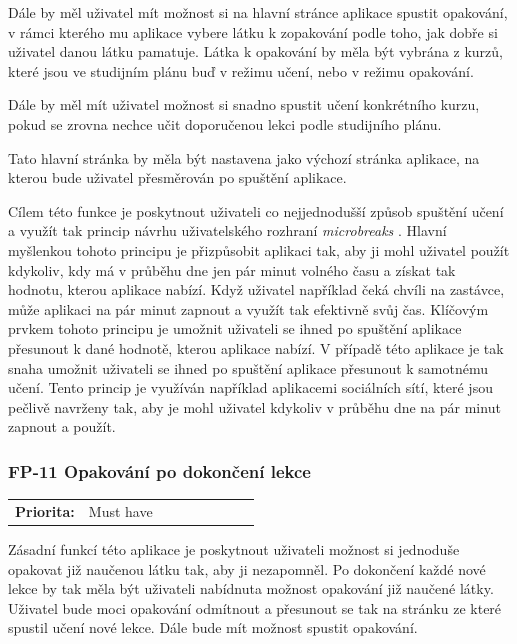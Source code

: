 Dále by měl uživatel mít možnost si na hlavní stránce aplikace spustit opakování, v rámci kterého mu aplikace vybere látku k zopakování podle toho, jak dobře si uživatel danou látku pamatuje. Látka k opakování by měla být vybrána z kurzů, které jsou ve studijním plánu buď v režimu učení, nebo v režimu opakování.

Dále by měl mít uživatel možnost si snadno spustit učení konkrétního kurzu, pokud se zrovna nechce učit doporučenou lekci podle studijního plánu.

Tato hlavní stránka by měla být nastavena jako výchozí stránka aplikace, na kterou bude uživatel přesměrován po spuštění aplikace.

Cílem této funkce je poskytnout uživateli co nejjednodušší způsob spuštění učení a využít tak princip návrhu uživatelského rozhraní \textit{microbreaks} \cite{Tidwell2020DesigningInterfaces}. Hlavní myšlenkou tohoto principu je přizpůsobit aplikaci tak, aby ji mohl uživatel použít kdykoliv, kdy má v průběhu dne jen pár minut volného času a získat tak hodnotu, kterou aplikace nabízí. Když uživatel například čeká chvíli na zastávce, může aplikaci na pár minut zapnout a využít tak efektivně svůj čas. Klíčovým prvkem tohoto principu je umožnit uživateli se ihned po spuštění aplikace přesunout k dané hodnotě, kterou aplikace nabízí. V případě této aplikace je tak snaha umožnit uživateli se ihned po spuštění aplikace přesunout k samotnému učení. Tento princip je využíván například aplikacemi sociálních sítí, které jsou pečlivě navrženy tak, aby je mohl uživatel kdykoliv v průběhu dne na pár minut zapnout a použít.

\subsubsection{FP-11 Opakování po dokončení lekce}\label{sec:fp-post-lesson-review}

\begin{tabular}{lp{0.7\linewidth}}
    \textbf{Priorita:} & Must have \\
\end{tabular}

Zásadní funkcí této aplikace je poskytnout uživateli možnost si jednoduše opakovat již naučenou látku tak, aby ji nezapomněl. Po dokončení každé nové lekce by tak měla být uživateli nabídnuta možnost opakování již naučené látky. Uživatel bude moci opakování odmítnout a přesunout se tak na stránku ze které spustil učení nové lekce. Dále bude mít možnost spustit opakování.

